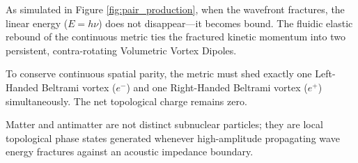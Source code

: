 As simulated in Figure \ref{fig:pair_production}, when the wavefront fractures, the linear energy ($E=h\nu$) does not disappear---it becomes bound. The fluidic elastic rebound of the continuous metric ties the fractured kinetic momentum into two persistent, contra-rotating Volumetric Vortex Dipoles.

To conserve continuous spatial parity, the metric must shed exactly one Left-Handed Beltrami vortex ($e^-$) and one Right-Handed Beltrami vortex ($e^+$) simultaneously. The net topological charge remains zero. 

Matter and antimatter are not distinct subnuclear particles; they are local topological phase states generated whenever high-amplitude propagating wave energy fractures against an acoustic impedance boundary.
